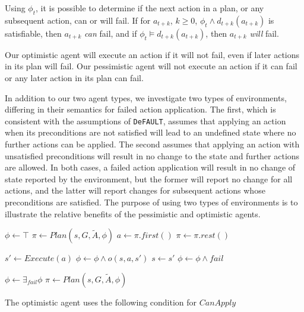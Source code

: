 \documentclass{article}
\def\FFRISKY{{\tt DeFAULT}}
\begin{document}
Using $\phi_t$, it is possible to determine if the next action in a plan, or any subsequent action, can or will fail.  If  for $a_{t+k}$, $k \geq 0$, $\phi_t \wedge d_{t+k}(a_{t+k})$ is satisfiable, then $a_{t+k}$ {\em can} fail, and if $\phi_t \models d_{t+k}(a_{t+k})$, then $a_{t+k}$ {\em will}  fail.

Our optimistic agent will execute an action if it will not fail, even if later actions in its plan will fail.  Our pessimistic agent will not execute an action if it can fail or any later action in its plan can fail.  

In addition to our two agent types, we investigate two types of environments, differing in their semantics for failed action application.  The first, which is consistent with the assumptions of \FFRISKY{}, assumes that applying an action when its preconditions are not satisfied will lead to an undefined state where no further actions can be applied.  The second assumes that applying an action with unsatisfied preconditions will result in no change to the state and further actions are allowed.  In both cases, a failed action application will result in no change of state reported by the environment, but the former will report no change for all actions, and the latter will report changes for subsequent actions whose preconditions are satisfied.  The purpose of using two types of environments is to illustrate the relative benefits of the pessimistic and optimistic agents.

\begin{algorithm}[t]
\caption{$Act(s, G, \tilde{A})$}\label{alg:replan}
\begin{algorithmic}
\STATE $\phi \gets \top$
\STATE $\pi \gets Plan(s, G, \tilde{A}, \phi)$
\STATE $a \gets \pi.first()$
\STATE $\pi \gets \pi.rest()$

	\STATE $s ' \gets Execute(a)$
	\STATE $\phi \gets \phi \wedge o(s, a, s')$
	\STATE $s \gets s'$
\ELSE
	\STATE $\phi \gets \phi \wedge fail$
\ENDIF

	\STATE $\phi \gets \exists_{fail}  \phi$
	\STATE $\pi \gets Plan(s, G, \tilde{A}, \phi)$
\ENDIF
\ENDWHILE
\end{algorithmic}
\end{algorithm}


The optimistic agent uses the following condition for $CanApply$
\end{document}
